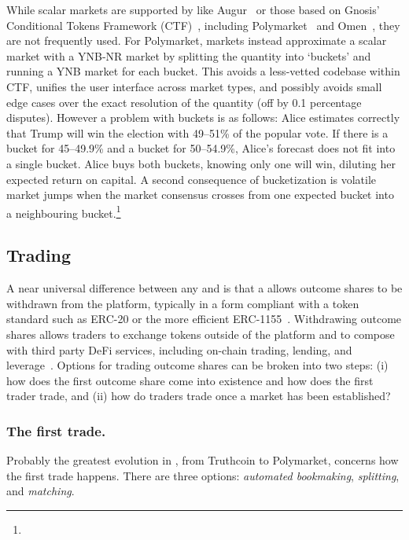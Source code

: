 While scalar markets are supported by \depms like Augur~\cite{AKPWZ15,AKPWZ19} or those based on Gnosis' Conditional Tokens Framework (CTF)~\cite{ctf}, including Polymarket~\cite{poly} and Omen~\cite{Omen_docs}, they are not frequently used. For Polymarket, markets instead approximate a scalar market with a YNB-NR market by splitting the quantity into `buckets' and running a YNB market for each bucket. This avoids a less-vetted codebase within CTF, unifies the user interface across market types, and possibly avoids small edge cases over the exact resolution of the quantity (\eg off by 0.1 percentage disputes). However a problem with buckets is as follows: Alice estimates correctly that Trump will win the election with 49--51\% of the popular vote. If there is a bucket for 45--49.9\% and a bucket for 50--54.9\%, Alice's forecast does not fit into a single bucket. Alice buys both buckets, knowing only one will win, diluting her expected return on capital. A second consequence of bucketization is volatile market jumps when the market consensus crosses from one expected bucket into a neighbouring bucket.\footnote{} 


\subsection{Trading}\label{wf:trade}

A near universal difference between any \cepm and \depm is that a \depm allows outcome shares to be withdrawn from the platform, typically in a form compliant with a token standard such as ERC-20 or the more efficient ERC-1155~\cite{LDBR24}. Withdrawing outcome shares allows traders to exchange tokens outside of the platform and to compose with third party DeFi services, including on-chain trading, lending, and leverage~\cite{WPG+22}. Options for trading outcome shares can be broken into two steps: (i) how does the first outcome share come into existence and how does the first trader trade, and (ii) how do traders trade once a market has been established? 

\subsubsection{The first trade.} Probably the greatest evolution in \depms, from Truthcoin to Polymarket, concerns how the first trade happens. There are three options: \textit{automated bookmaking}, \textit{splitting}, and \textit{matching}. 

